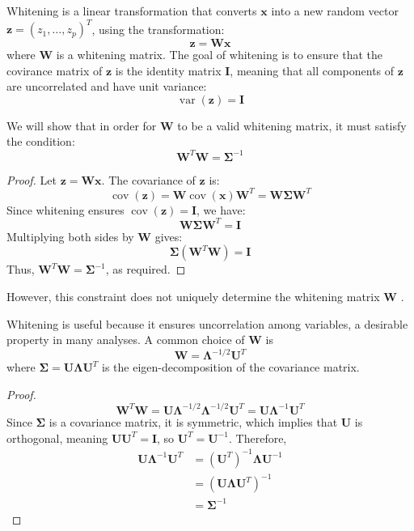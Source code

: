 \documentclass[12pt]{article}
\begin{document}
Whitening is a linear transformation that converts \( \mathbf{x} \) into a new random vector \( \mathbf{z}=\left(z_1, \ldots, z_p\right)^T \), using the transformation:
\[
  \mathbf{z}=\mathbf{W} \mathbf{x}
\]
where \( \mathbf{W} \) is a whitening matrix. The goal of whitening is to ensure that the covirance matrix of \( \mathbf{z} \) is the identity matrix \( \mathbf{I} \), meaning that all components of \( \mathbf{z} \) are uncorrelated and have unit variance:
\[
  \operatorname{var}(\mathbf{z})=\mathbf{I}
\]

We will show that in order for \( \mathbf{W} \) to be a valid whitening matrix, it must satisfy the condition:
\[
  \mathbf{W}^T \mathbf{W}=\boldsymbol{\Sigma}^{-1}
\]

\begin{proof}
  Let \( \mathbf{z} = \mathbf{W} \mathbf{x} \). The covariance of \( \mathbf{z} \) is:
  \[
    \operatorname{cov}(\mathbf{z}) = \mathbf{W} \operatorname{cov}(\mathbf{x}) \mathbf{W}^T = \mathbf{W} \boldsymbol{\Sigma} \mathbf{W}^T
  \]
  Since whitening ensures \( \operatorname{cov}(\mathbf{z}) = \mathbf{I} \), we have:
  \[
    \mathbf{W} \boldsymbol{\Sigma} \mathbf{W}^T = \mathbf{I}
  \]
  Multiplying both sides by \( \mathbf{W} \) gives:
  \[
    \boldsymbol{\Sigma} (\mathbf{W}^T \mathbf{W}) = \mathbf{I}
  \]
  Thus, \( \mathbf{W}^T \mathbf{W} = \boldsymbol{\Sigma}^{-1} \), as required.
\end{proof}

However, this constraint does not uniquely determine the whitening matrix \( \mathbf{W} \) \cite{kessy2018optimal}.

Whitening is useful because it ensures uncorrelation among variables, a desirable property in many analyses. A common choice of \( \mathbf{W} \) is
\[
  \mathbf{W}=\boldsymbol{\Lambda}^{-1 / 2} \mathbf{U}^T
\]
where \( \boldsymbol{\Sigma}=\mathbf{U} \boldsymbol{\Lambda} \mathbf{U}^T \) is the eigen-decomposition of the covariance matrix. 

\begin{proof}
  \[
    \mathbf{W}^T \mathbf{W}=\mathbf{U} \boldsymbol{\Lambda}^{-1 / 2} \boldsymbol{\Lambda}^{-1 / 2} \mathbf{U}^T=\mathbf{U} \boldsymbol{\Lambda}^{-1} \mathbf{U}^T
  \]
  Since \( \boldsymbol{\Sigma} \) is a covariance matrix, it is symmetric, which implies that \( \mathbf{U} \) is orthogonal, meaning \( \mathbf{U U}^T = \mathbf{I} \), so \( \mathbf{U}^T = \mathbf{U}^{-1} \). Therefore,
  \[
    \begin{aligned}
      \mathbf{U} \boldsymbol{\Lambda}^{-1} \mathbf{U}^T & = \left(\mathbf{U}^T\right)^{-1} \boldsymbol{\Lambda} \mathbf{U}^{-1} \\
                                                        & = \left(\mathbf{U} \boldsymbol{\Lambda} \mathbf{U}^T\right)^{-1} \\
                                                        & = \boldsymbol{\Sigma}^{-1}
  \end{aligned}
  \]
\end{proof}
\end{document}

